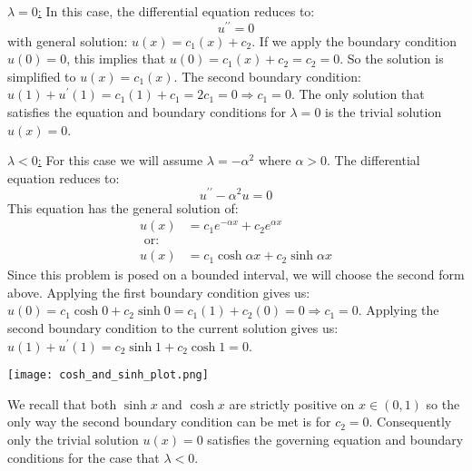 \vspace{0.5cm}

\noindent \underline{$\lambda = 0$:}  In this case, the differential equation reduces to:
\begin{equation*}
u^{\prime \prime} = 0
\end{equation*}
with general solution: $u(x) = c_1(x) + c_2$.  If we apply the boundary condition $u(0) = 0$, this implies that $u(0) = c_1(x) + c_2 = c_2 = 0$. So the solution is simplified to $u(x) = c_1(x)$.  The second boundary condition: $u(1) + u^{\prime}(1) = c_1(1) + c_1 = 2c_1 = 0 \Rightarrow c_1 = 0$. The only solution that satisfies the equation and boundary conditions for $\lambda = 0$ is the trivial solution $u(x) = 0$.

\vspace{0.5cm}

\noindent\underline{$\lambda < 0$:}  For this case we will assume $\lambda = -\alpha^2$ where $\alpha > 0$.  The differential equation reduces to:
\begin{equation*}
u^{\prime \prime} - \alpha^2u = 0
\end{equation*}
This equation has the general solution of:
\begin{align*}
u(x) &= c_1e^{-\alpha x} + c_2e^{\alpha x} \\
\text{ or: } & \\
u(x) &=c_1 \cosh{\alpha x} + c_2 \sinh{\alpha x} 
\end{align*}
Since this problem is posed on a bounded interval, we will choose the second form above.  Applying the first boundary condition gives us: $u(0) = c_1\cosh{0} + c_2\sinh{0} = c_1(1) + c_2(0) = 0 \Rightarrow c_1 = 0$.  Applying the second boundary condition to the current solution gives us: $u(1) + u^{\prime}(1) = c_2\sinh{1} + c_2\cosh{1} = 0$. \begin{marginfigure} \texttt{[image: cosh\_and\_sinh\_plot.png]} \end{marginfigure}  
We recall that both $\sinh{x}$ and $\cosh{x}$ are strictly positive on $x\in(0,1)$ so the only way the second boundary condition can be met is for $c_2 = 0$.  Consequently only the trivial solution $u(x) = 0$ satisfies the governing equation and boundary conditions for the case that $\lambda < 0$.

